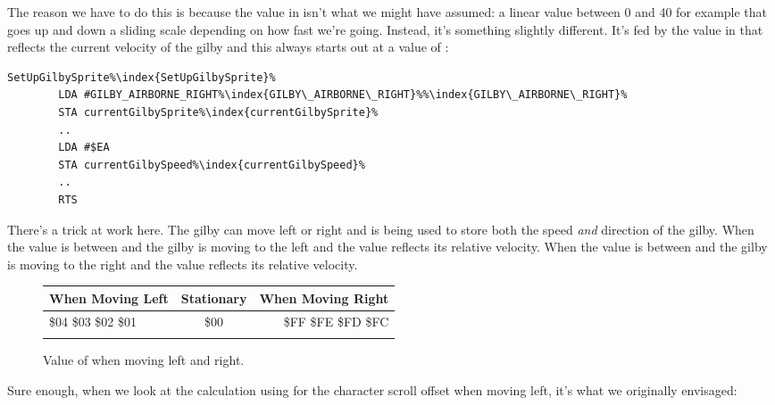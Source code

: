 The reason we have to do this is because the value in  isn't what we might have
assumed: a linear value between 0 and 40 for example that goes up and down a sliding scale depending on
how fast we're going. Instead, it's something slightly different. It's fed by the value in 
that reflects the current velocity of the gilby and this always starts out at a value of :

\begin{lstlisting}[escapechar=\%]
SetUpGilbySprite%\index{SetUpGilbySprite}%
        LDA #GILBY_AIRBORNE_RIGHT%\index{GILBY\_AIRBORNE\_RIGHT}%%\index{GILBY\_AIRBORNE\_RIGHT}%
        STA currentGilbySprite%\index{currentGilbySprite}%
        ..
        LDA #$EA
        STA currentGilbySpeed%\index{currentGilbySpeed}%
        ..
        RTS
\end{lstlisting}

There's a trick at work here. The gilby can move left or right and  is being used to
store both the speed \textit{and} direction of the gilby. When the value is between  and  the gilby is moving
to the left and the value reflects its relative velocity. When the value is between  and  the gilby is
moving to the right and the value reflects its relative velocity.


\begin{figure}[H]
  {
    \setlength{\tabcolsep}{3.0pt}
    \setlength\cmidrulewidth{\heavyrulewidth} %
    \begin{adjustbox}{width=8cm,center}

      \begin{tabular}{lcr}
        \toprule
        When Moving Left & Stationary &  When Moving Right    \\
        \midrule
        \$04 \$03 \$02 \$01 & \$00 & \$FF \$FE \$FD \$FC \\
        \addlinespace
        \bottomrule
      \end{tabular}
    \end{adjustbox}
  }\caption{Value of  when moving left and right.}
\end{figure}
\vspace{-0.05cm}

Sure enough, when we look at the calculation using for the character scroll offset when moving left, it's what we
originally envisaged:

